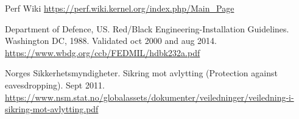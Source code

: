 \renewcommand*{\bibname}{References}



\begin{thebibliography}{18}



 Perf Wiki
\url{https://perf.wiki.kernel.org/index.php/Main_Page}



 Department of Defence, US. Red/Black Engineering-Installation Guidelines. Washington DC, 1988. Validated oct 2000 and aug 2014.
\url{https://www.wbdg.org/ccb/FEDMIL/hdbk232a.pdf}

 Norges Sikkerhetsmyndigheter. Sikring mot avlytting (Protection against eavesdropping). Sept 2011. 
\url{https://www.nsm.stat.no/globalassets/dokumenter/veiledninger/veiledning-i-sikring-mot-avlytting.pdf}

\end{thebibliography}